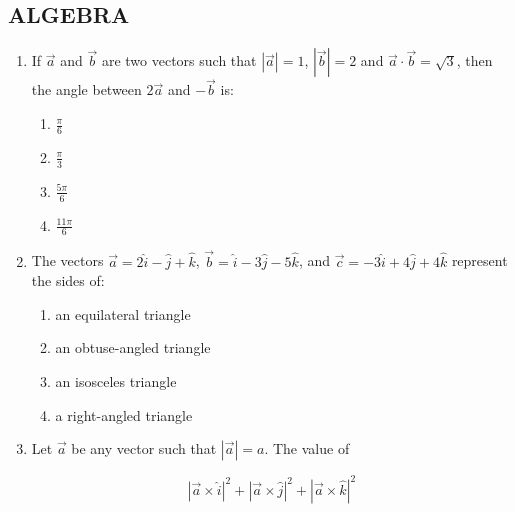 \documentclass{article}
\begin{document}
\subsection*{ALGEBRA}




\begin{enumerate}[label=\textbf{\arabic*.}] %

    \item If \( \overset{\rightarrow}{a} \) and \( \overset{\rightarrow}{b} \) are two vectors such that \(\left| \overset{\rightarrow}{a} \right| = 1\), \(\left| \overset{\rightarrow}{b} \right| = 2\) and \( \overset{\rightarrow}{a} \cdot \overset{\rightarrow}{b} = \sqrt{3} \), then the angle between \( 2 \overset{\rightarrow}{a} \) and \( -\overset{\rightarrow}{b} \) is:

    \begin{enumerate}[label=\alph*)] %
        \item \(\frac{\pi}{6}\)
        \item \(\frac{\pi}{3}\)
        \item \(\frac{5\pi}{6}\)
        \item \(\frac{11\pi}{6}\)
    \end{enumerate}

    \item The vectors \( \overset{\rightarrow}{a} = 2 \hat{i} - \hat{j} + \hat{k} \), \( \overset{\rightarrow}{b} = \hat{i} - 3 \hat{j} - 5 \hat{k} \), and \( \overset{\rightarrow}{c} = -3 \hat{i} + 4 \hat{j} + 4 \hat{k} \) represent the sides of:

    \begin{enumerate}[label=\alph*)] %
        \item an equilateral triangle
        \item an obtuse-angled triangle
        \item an isosceles triangle
        \item a right-angled triangle
    \end{enumerate}

    \item Let \( \overset{\rightarrow}{a} \) be any vector such that \(\left| \overset{\rightarrow}{a} \right| = a\). The value of

    \[
    \left| \overset{\rightarrow}{a} \times \hat{i} \right|^2 + \left| \overset{\rightarrow}{a} \times \hat{j} \right|^2 + \left| \overset{\rightarrow}{a} \times \hat{k} \right|^2
    \]


\end{enumerate}
\end{document}

